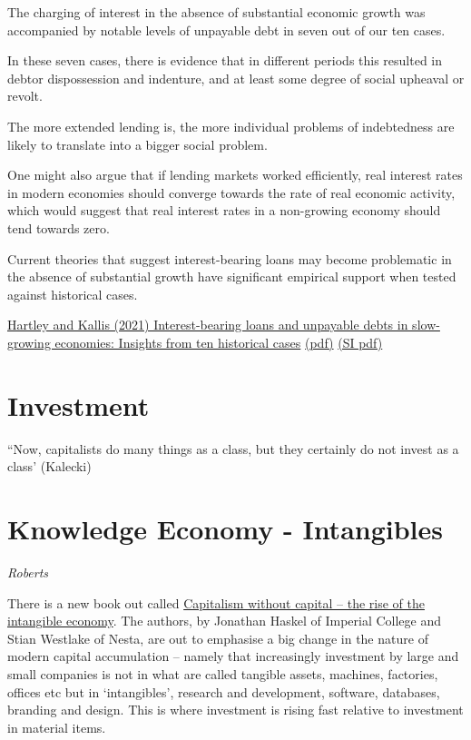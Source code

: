 \documentclass[
]{book}
\begin{document}
The charging of interest in the absence
of substantial economic growth was accompanied by notable levels of
unpayable debt in seven out of our ten cases.

In these seven
cases, there is evidence that in different periods this resulted in debtor
dispossession and indenture, and at least some degree of social upheaval
or revolt.

The more extended lending is, the more individual problems of
indebtedness are likely to translate into a bigger social problem.

One might also argue
that if lending markets worked efficiently, real interest rates in modern
economies should converge towards the rate of real economic activity,
which would suggest that real interest rates in a non-growing economy
should tend towards zero.

Current theories that
suggest interest-bearing loans may become problematic in the absence
of substantial growth have significant empirical support when tested
against historical cases.

\href{https://www.sciencedirect.com/science/article/pii/S0921800921001907}{Hartley and Kallis (2021) Interest-bearing loans and unpayable debts in slow-growing economies: Insights from ten historical cases}
\href{pdf/Hartley_Kallis_2021_Unpayable_debt.pdf}{(pdf)}
\href{pdf/Hartley_Kallis_2021_Unpayable_debt_SI.pdf}{(SI pdf)}

\hypertarget{investment}{%
\chapter{Investment}\label{investment}}

``Now, capitalists do many things as a class, but they certainly do not
invest as a class' (Kalecki)

\hypertarget{knowledge-economy---intangibles}{%
\chapter{Knowledge Economy - Intangibles}\label{knowledge-economy---intangibles}}

\emph{Roberts}

There is a new book out called \href{https://press.princeton.edu/titles/11086.html}{Capitalism without capital -- the rise of the intangible economy}. The authors, by Jonathan Haskel of Imperial College and Stian Westlake of Nesta, are out to emphasise a big change in the nature of modern capital accumulation -- namely that increasingly investment by large and small companies is not in what are called tangible assets, machines, factories, offices etc but in `intangibles', research and development, software, databases, branding and design. This is where investment is rising fast relative to investment in material items.
\end{document}
